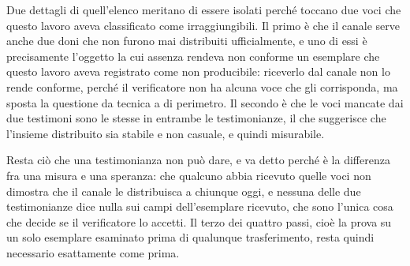 Due dettagli di quell'elenco meritano di essere isolati perché toccano due voci che questo lavoro aveva classificato come irraggiungibili. Il primo è che il canale serve anche due doni che non furono mai distribuiti ufficialmente, e uno di essi è precisamente l'oggetto la cui assenza rendeva non conforme un esemplare che questo lavoro aveva registrato come non producibile: riceverlo dal canale non lo rende conforme, perché il verificatore non ha alcuna voce che gli corrisponda, ma sposta la questione da tecnica a di perimetro. Il secondo è che le voci mancate dai due testimoni sono le stesse in entrambe le testimonianze, il che suggerisce che l'insieme distribuito sia stabile e non casuale, e quindi misurabile.

Resta ciò che una testimonianza non può dare, e va detto perché è la differenza fra una misura e una speranza: che qualcuno abbia ricevuto quelle voci non dimostra che il canale le distribuisca a chiunque oggi, e nessuna delle due testimonianze dice nulla sui campi dell'esemplare ricevuto, che sono l'unica cosa che decide se il verificatore lo accetti. Il terzo dei quattro passi, cioè la prova su un solo esemplare esaminato prima di qualunque trasferimento, resta quindi necessario esattamente come prima.
